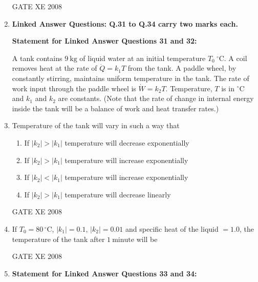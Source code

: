 \documentclass[12pt]{article}
\begin{document}
\begin{enumerate}
 GATE XE 2008  

\item[] \textbf{\Large Linked Answer Questions: Q.31 to Q.34 carry two marks each.}

\textbf{Statement for Linked Answer Questions 31 and 32:}  

A tank contains $9~\mathrm{kg}$ of liquid water at an initial temperature $T_0~^{\circ}\mathrm{C}$.  
A coil removes heat at the rate of $\dot{Q} = k_1 T$ from the tank. A paddle wheel, by constantly stirring, maintains uniform temperature in the tank.  
The rate of work input through the paddle wheel is $\dot{W} = k_2 T$. Temperature, $T$ is in $^{\circ}\mathrm{C}$ and $k_1$ and $k_2$ are constants.  
(Note that the rate of change in internal energy inside the tank will be a balance of work and heat transfer rates.)  

\item Temperature of the tank will vary in such a way that  

\begin{enumerate}
\item  If $|k_2| > |k_1|$ temperature will decrease exponentially  
\item  If $|k_2| > |k_1|$ temperature will increase exponentially  
\item  If $|k_2| < |k_1|$ temperature will increase exponentially  
\item  If $|k_2| > |k_1|$ temperature will decrease linearly  
\end{enumerate}

GATE XE 2008  

\item If $T_0 = 80\,^{\circ}\mathrm{C}$, $|k_1| = 0.1$, $|k_2| = 0.01$ and specific heat of the liquid $= 1.0$, the temperature of the tank after $1~\mathrm{minute}$ will be  

\begin{enumerate}
\end{enumerate}

GATE XE 2008  

\item[] \textbf{Statement for Linked Answer Questions 33 and 34:}  


\end{enumerate}
\end{document}
